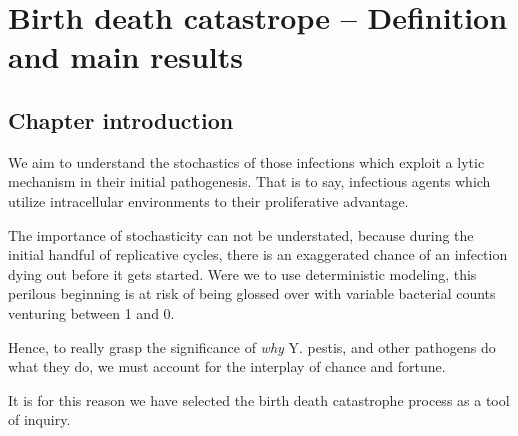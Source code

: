 



\chapter{Birth death catastrope -- Definition and main results}





\section{Chapter introduction}











We aim to understand the stochastics of those infections which exploit a lytic mechanism in their initial pathogenesis. That is to say, infectious agents which utilize intracellular environments to their proliferative advantage.\par

The importance of stochasticity can not be understated, because during the initial handful of replicative cycles, there is an exaggerated 
chance of an infection dying out before it gets started. Were we to use deterministic modeling, this perilous beginning is at risk of being glossed over with variable bacterial counts venturing between 1 and 0. \par

Hence, to really grasp the significance of \textit{why} Y. pestis, and other pathogens do what they do, we must account for the interplay of chance and fortune. 

It is for this reason we have selected the birth death catastrophe process as a tool of inquiry. \par
\vspace{25pt}





